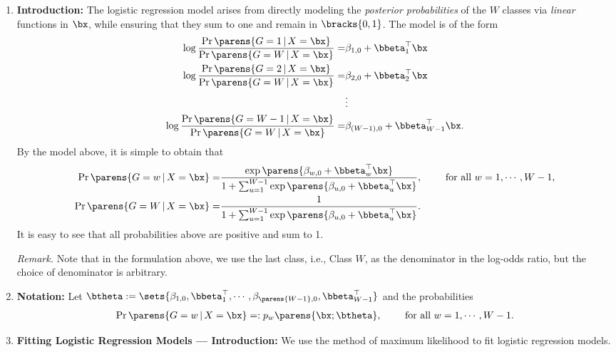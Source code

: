 \documentclass[12pt]{article}
\begin{document}
\begin{enumerate}[label=\textbf{\arabic*.}]

	\item \textbf{Introduction:} The logistic regression model arises from directly modeling the \textit{posterior probabilities} of the $W$ classes via \textit{linear} functions in $\bx$, while ensuring that they sum to one and remain in $\bracks{0, 1}$. The model is of the form 
	\begin{align*}
		\log \frac{\Pr \parens{G = 1 \,\vert\, X = \bx}}{\Pr \parens{G = W \,\vert\, X = \bx}} = & \beta_{1,0} + \bbeta_{1}^\top \bx \\
		\log \frac{\Pr \parens{G = 2 \,\vert\, X = \bx}}{\Pr \parens{G = W \,\vert\, X = \bx}} = & \beta_{2,0} + \bbeta_{2}^\top \bx \\
		& \vdots  \\
		\log \frac{\Pr \parens{G = W - 1 \,\vert\, X = \bx}}{\Pr \parens{G = W \,\vert\, X = \bx}} = & \beta_{(W-1),0} + \bbeta_{W-1}^\top \bx. 
	\end{align*}
	By the model above, it is simple to obtain that 
	\begin{align*}
		\Pr \parens{G = w \,\vert\, X = \bx} = & \frac{\exp \parens{\beta_{w,0} + \bbeta_w^\top \bx}}{1 + \sum_{u=1}^{W-1} \exp \parens{\beta_{u, 0} + \bbeta_u^\top \bx}}, \qquad \text{ for all } w = 1, \cdots, W - 1, \\ 
		\Pr \parens{G = W \,\vert\, X = \bx} = & \frac{1}{1 + \sum_{u=1}^{W-1} \exp \parens{\beta_{u, 0} + \bbeta_u^\top \bx}}. 
	\end{align*}
	It is easy to see that all probabilities above are positive and sum to 1. 
	
	\textit{Remark.} Note that in the formulation above, we use the last class, i.e., Class $W$, as the denominator in the log-odds ratio, but the choice of denominator is arbitrary. 
	
	\item \textbf{Notation:} Let $\btheta := \sets{\beta_{1,0}, \bbeta_{1}^\top, \cdots, \beta_{\parens{W-1},0}, \bbeta_{W-1}^\top}$ and the probabilities 
	\begin{align*}
		\Pr \parens{G = w \,\vert\, X = \bx} =: p_w \parens{\bx; \btheta}, \qquad \text{ for all } w = 1, \cdots, W-1. 
	\end{align*}
	
	\item \textbf{Fitting Logistic Regression Models --- Introduction:} We use the method of maximum likelihood to fit logistic regression models. 
	

\end{enumerate}
\end{document}
